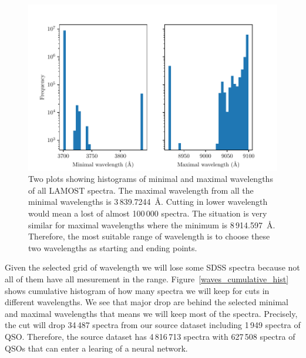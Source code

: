 \begin{figure}
\includegraphics[width=\textwidth]{img/wavemin_wavemax_hist.pdf}
\caption[Minimal and maximal wavelength of LAMOST DR5]{
	Two plots showing histograms of minimal and maximal wavelengths
	of all LAMOST spectra.
	The maximal wavelength from all the minimal wavelengths
	is 3\,839.7244~\AA{}.
	Cutting in lower wavelength
	would mean a lost of almost 100\,000 spectra.
	The situation is very similar for maximal wavelengths
	where the minimum is 8\,914.597~\AA{}.
	Therefore, the most suitable range of wavelength is to choose
	these two wavelengths as starting and ending points.
	}
\label{wavemin_wavemax_hist}
\end{figure}

Given the selected grid of wavelength we will lose some SDSS spectra
because not all of them have all mesurement in the range.
Figure~\ref{waves_cumulative_hist} shows cumulative histogram of how many spectra we will keep for cuts in different wavelengths.
We see that major drop are behind the selected minimal and maximal wavelengths
that means we will keep most of the spectra.
Precisely, the cut will drop 34\,487 spectra from our source dataset
including 1\,949 spectra of QSO.
Therefore, the source dataset has 4\,816\,713 spectra with 627\,508 spectra of QSOs that can enter a learing of a neural network.

